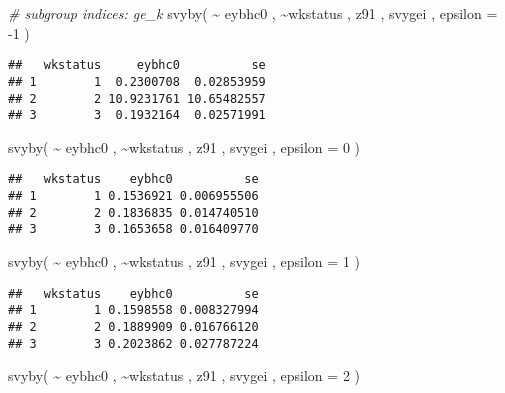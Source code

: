\documentclass[
]{book}
\newenvironment{Shaded}{\begin{snugshade}}{\end{snugshade}}
\newcommand{\AttributeTok}[1]{\textcolor[rgb]{0.77,0.63,0.00}{#1}}
\newcommand{\CommentTok}[1]{\textcolor[rgb]{0.56,0.35,0.01}{\textit{#1}}}
\newcommand{\DecValTok}[1]{\textcolor[rgb]{0.00,0.00,0.81}{#1}}
\newcommand{\FunctionTok}[1]{\textcolor[rgb]{0.00,0.00,0.00}{#1}}
\newcommand{\NormalTok}[1]{#1}
\newcommand{\SpecialCharTok}[1]{\textcolor[rgb]{0.00,0.00,0.00}{#1}}
\begin{document}
\begin{Shaded}
\begin{Highlighting}[]
\CommentTok{\# subgroup indices: ge\_k}
\FunctionTok{svyby}\NormalTok{( }\SpecialCharTok{\textasciitilde{}}\NormalTok{ eybhc0 , }\SpecialCharTok{\textasciitilde{}}\NormalTok{wkstatus , z91 , svygei , }\AttributeTok{epsilon =} \SpecialCharTok{{-}}\DecValTok{1}\NormalTok{ )}
\end{Highlighting}
\end{Shaded}

\begin{verbatim}
##   wkstatus     eybhc0          se
## 1        1  0.2300708  0.02853959
## 2        2 10.9231761 10.65482557
## 3        3  0.1932164  0.02571991
\end{verbatim}

\begin{Shaded}
\begin{Highlighting}[]
\FunctionTok{svyby}\NormalTok{( }\SpecialCharTok{\textasciitilde{}}\NormalTok{ eybhc0 , }\SpecialCharTok{\textasciitilde{}}\NormalTok{wkstatus , z91 , svygei , }\AttributeTok{epsilon =} \DecValTok{0}\NormalTok{ )}
\end{Highlighting}
\end{Shaded}

\begin{verbatim}
##   wkstatus    eybhc0          se
## 1        1 0.1536921 0.006955506
## 2        2 0.1836835 0.014740510
## 3        3 0.1653658 0.016409770
\end{verbatim}

\begin{Shaded}
\begin{Highlighting}[]
\FunctionTok{svyby}\NormalTok{( }\SpecialCharTok{\textasciitilde{}}\NormalTok{ eybhc0 , }\SpecialCharTok{\textasciitilde{}}\NormalTok{wkstatus , z91 , svygei , }\AttributeTok{epsilon =} \DecValTok{1}\NormalTok{ )}
\end{Highlighting}
\end{Shaded}

\begin{verbatim}
##   wkstatus    eybhc0          se
## 1        1 0.1598558 0.008327994
## 2        2 0.1889909 0.016766120
## 3        3 0.2023862 0.027787224
\end{verbatim}

\begin{Shaded}
\begin{Highlighting}[]
\FunctionTok{svyby}\NormalTok{( }\SpecialCharTok{\textasciitilde{}}\NormalTok{ eybhc0 , }\SpecialCharTok{\textasciitilde{}}\NormalTok{wkstatus , z91 , svygei , }\AttributeTok{epsilon =} \DecValTok{2}\NormalTok{ )}
\end{Highlighting}
\end{Shaded}
\end{document}
